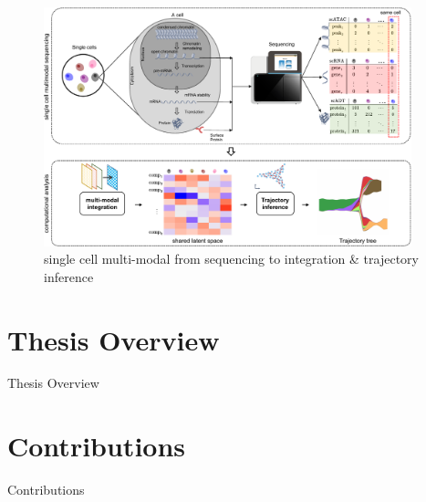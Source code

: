\begin{figure}[!ht]
	\centering
	\includegraphics[width=0.95\textwidth]{multimodal_schematic/fig}
	\vspace{0.1cm}
	\caption[single cell multi-modal from sequencing to integration \& trajectory inference]{single cell multi-modal from sequencing to integration \& trajectory inference}
	\label{fig:sc_mulitmodal_sequencing_to_integration_ti}
\end{figure}


\section{Thesis Overview}
\label{introduction:sec2.overview}




Thesis Overview
\section{Contributions}
\label{introduction:sec3.contributions}

Contributions

